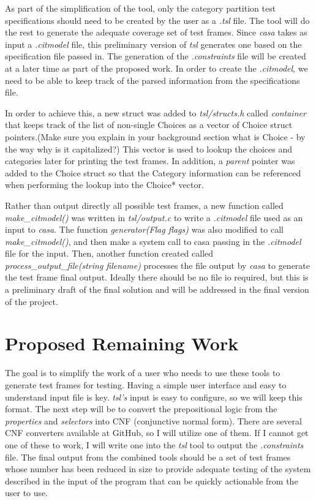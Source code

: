 \documentclass[a4full,12pt]{article}
\newcommand{\eas}[1]{{\color{blue}\sf ({#1})}}
\begin{document}
As part of the simplification of the tool, only the category partition test specifications
  should need to be created by the user as a \emph{.tsl} file. The tool will do the rest to
  generate the adequate coverage set of test frames. Since \emph{casa} takes as input a 
  \emph{.citmodel} file, this preliminary version of \emph{tsl} generates one based on the
  specification file passed in. The generation of the \emph{.constraints} file will be created
  at a later time as part of the proposed work. In order to create the \emph{.citmodel}, we need
  to be able to keep track of the parsed information from the specifications file.
  
In order to achieve this, a new struct was added to \emph{tsl/structs.h} called \emph{container} that
  keeps track of the list of non-single Choices as a vector of Choice struct
  pointers.\eas{Make sure you explain in your background section what is Choice - by the way why is it capitalized?} This vector is used to lookup the choices and categories later for
  printing the test frames. In addition, a \emph{parent} pointer was added to
  the Choice struct so that the Category information can be referenced when
  performing the lookup into the Choice* vector.
  
Rather than output directly all possible test frames, a new function called
  \emph{make\_citmodel()} was written in \emph{tsl/output.c} to write a 
  \emph{.citmodel} file used as an input to \emph{casa}. The function
  \emph{generator(Flag flags)} was also modified to call \emph{make\_citmodel()},
  and then make a system call to casa passing in the \emph{.citmodel} file for
  the input. Then, another function created  called
  \emph{process\_output\_file(string filename)} processes the file output by
  \emph{casa} to generate the test frame final output. Ideally there should be
  no file io required, but this is a preliminary draft of the final solution
  and will be addressed in the final version of the project.
  
  \section{Proposed Remaining Work}
The goal is to simplify the work of a user who needs to use these tools to generate test frames
  for testing. Having a simple user interface and easy to understand input file is key. \emph{tsl's}
  input is easy to configure, so we will keep this format. The next step will be to convert the
  prepositional logic from the \emph{properties} and \emph{selectors} into CNF (conjunctive normal
  form). There are several CNF converters available at GitHub, so I will utilize one of them. If
  I cannot get one of these to work, I will write one into the \emph{tsl} tool to output the
  \emph{.constraints} file. The final output from the combined tools should be a set of test
  frames whose number has been reduced in size to provide adequate testing of the system described
  in the input of the program that can be quickly actionable from the user to use.
  
\end{document}
